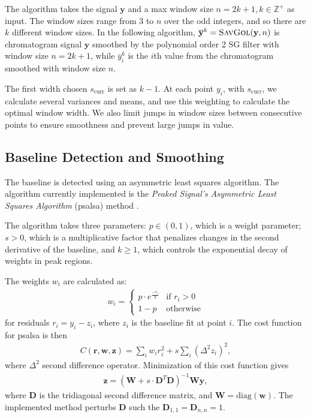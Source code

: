 \documentclass{article}
\begin{document}
The algorithm takes the signal $\mathbf{y}$ and a max window size $n = 2k+1, k \in \mathbb{Z}^+$ as input. The window sizes range from 3 to $n$ over the odd integers, and so there are $k$ different window sizes. In the following algorithm, $\overline{\mathbf{y}}^k = \textsc{SavGol}(\mathbf{y}, n)$ is chromatogram signal $\mathbf{y}$ smoothed by the polynomial order 2 SG filter with window size $n =2k+1$, while $\overline{y}^k_i$ is the $i$th value from the chromatogram smoothed with window size $n$. 

The first width chosen $s_{\text{curr}}$ is set as $k-1$. At each point $y_i$, with $s_{\text{curr}}$, we calculate several variances and means, and use this weighting to calculate the optimal window width. We also limit jumps in window sizes between consecutive points to ensure smoothness and prevent large jumps in value. 

\subsection{Baseline Detection and Smoothing}\label{sec:psalsa}
The baseline is detected using an asymmetric least squares algorithm. The algorithm currently implemented is the \textit{Peaked Signal's Asymmetric
Least Squares Algorithm} (psalsa) method \cite{psalsa}.

The algorithm takes three parameters: $p \in (0,1)$, which is a weight parameter; $s > 0$, which is a multiplicative factor that penalizes changes in the second derivative of the baseline, and $k\geq 1$, which controls the exponential decay of weights in peak regions. 

The weights $w_i$ are calculated as:
\begin{align}
w_i = \begin{cases}
	p \cdot e^{\frac{-r_i}{k}} & \text{if } r_i > 0\\
	1-p & \text{otherwise}
\end{cases} \label{eqn:weights}
\end{align}
for residuals $r_i = y_i-z_i$, where $z_i$ is the baseline fit at point $i$. The cost function for psalsa is then
\begin{align}
C(\mathbf{r},\mathbf{w},\mathbf{z}) = \sum_i w_i r_i^2 + s \sum_i (\Delta^2 z_i)^2,
\end{align}
where $\Delta^2$ second difference operator. Minimization of this cost function gives 
\begin{align}
\mathbf{z} = (\mathbf{W} + s \cdot \mathbf{D}^T\mathbf{D})^{-1}\mathbf{W}\mathbf{y},
\end{align}
where $\mathbf{D}$ is the tridiagonal second difference matrix, and $\mathbf{W} = \text{diag}(\mathbf{w})$. The implemented method perturbs $\mathbf{D}$ such the $\mathbf{D}_{1,1} = \mathbf{D}_{n,n} = 1$. 
\end{document}

